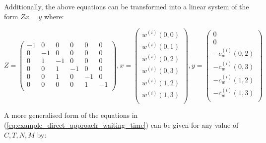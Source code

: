 \vspace{0.5cm}

Additionally, the above equations can be transformed into a linear system of
the form \(Zx=y\) where:

\begin{equation}\label{eq:example_direct_approach_waiting_time}
    Z=
    \begin{pmatrix}
       -1 &  0 &  0 &  0 &  0 &  0 \\  %
        0 & -1 &  0 &  0 &  0 &  0 \\  %
        0 &  1 & -1 &  0 &  0 &  0 \\  %
        0 &  0 &  1 & -1 &  0 &  0 \\  %
        0 &  0 &  1 &  0 & -1 &  0 \\  %
        0 &  0 &  0 &  0 &  1 & -1 \\  %
    \end{pmatrix},
    x=
    \begin{pmatrix}
        w^{(i)}(0,0) \\
        w^{(i)}(0,1) \\
        w^{(i)}(0,2) \\
        w^{(i)}(0,3) \\
        w^{(i)}(1,2) \\
        w^{(i)}(1,3) \\
    \end{pmatrix},
    y=
    \begin{pmatrix}
        0 \\
        0 \\
        -c^{(i)}_w(0,2) \\
        -c^{(i)}_w(0,3) \\
        -c^{(i)}_w(1,2) \\
        -c^{(i)}_w(1,3) \\
    \end{pmatrix}
\end{equation}

A more generalised form of the equations in
(\ref{eq:example_direct_approach_waiting_time}) can be given for any value of
\(C,T,N,M\) by:


